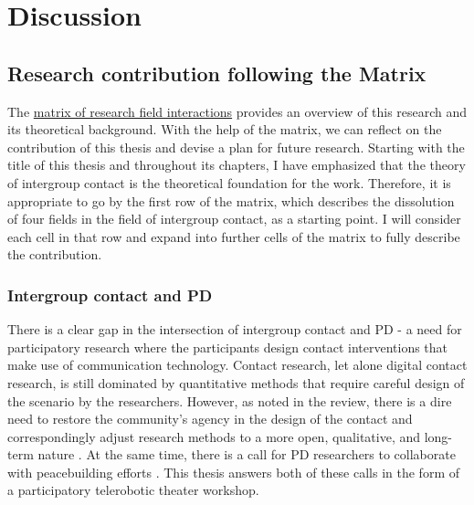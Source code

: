 \documentclass[dissertation,math,vertlayout,pdfa,colorlinks,nologo]{aaltoseries}
\begin{document}
\chapter{Discussion}

\section{Research contribution following the Matrix}
The \hyperref[sec:matrix_of_intersections]{matrix of research field interactions} provides an overview of this research and its theoretical background. With the help of the matrix, we can reflect on the contribution of this thesis and devise a plan for future research. Starting with the title of this thesis and throughout its chapters, I have emphasized that the theory of intergroup contact is the theoretical foundation for the work. Therefore, it is appropriate to go by the first row of the matrix, which describes the dissolution of four fields in the field of intergroup contact, as a starting point. I will consider each cell in that row and expand into further cells of the matrix to fully describe the contribution.

\subsection{Intergroup contact and PD}
There is a clear gap in the intersection of intergroup contact and PD - a need for participatory research where the participants design contact interventions that make use of communication technology. Contact research, let alone digital contact research, is still dominated by quantitative methods that require careful design of the scenario by the researchers. However, as noted in the review, there is a dire need to restore the community's agency in the design of the contact and correspondingly adjust research methods to a more open, qualitative, and long-term nature \cite{dixonNegativeContactCollective2021}. At the same time, there is a call for PD researchers to collaborate with peacebuilding efforts \cite{bodkerAfterthoughtsEmergentFuture2025}. This thesis answers both of these calls in the form of a participatory telerobotic theater workshop. 
\end{document}
